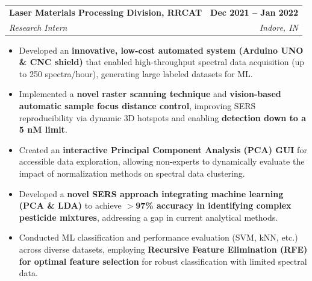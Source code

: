 \documentclass[letterpaper,11pt]{article}
\makeatletter
\newcommand{\resumeItem}[1]{
  \item\small{
    {#1 \vspace{-2pt}}
  }
}
\newcommand{\resumeSubheading}[4]{
  \vspace{-2pt}\item
    \begin{tabular*}{1.0\textwidth}[t]{l@{\extracolsep{\fill}}r}
      \textbf{#1} & \textbf{\small #2} \\
      \textit{\small#3} & \textit{\small #4} \\
    \end{tabular*}\vspace{-7pt}
}
\newcommand{\resumeItemListStart}{\begin{itemize}}
\newcommand{\resumeItemListEnd}{\end{itemize}\vspace{-5pt}}
\makeatother
\begin{document}

\resumeSubheading
{Laser Materials Processing Division, RRCAT \href{https://drive.google.com/file/d/17LdNpJl5PiLeAiSnUvo3jRqvBoKuyRCR/view?usp=sharing}{\raisebox{-0.2\height}\faExternalLink}}{Dec 2021 -- Jan 2022}
{Research Intern}{Indore, IN}
\resumeItemListStart
\resumeItem{Developed an \textbf{innovative, low-cost automated system (Arduino UNO \& CNC shield)} that enabled high-throughput spectral data acquisition (up to 250 spectra/hour), generating large labeled datasets for ML.}
\resumeItem{Implemented a \textbf{novel raster scanning technique} and \textbf{vision-based automatic sample focus distance control}, improving SERS reproducibility via dynamic 3D hotspots and enabling \textbf{detection down to a 5 nM limit}.}
\resumeItem{Created an \textbf{interactive Principal Component Analysis (PCA) GUI} for accessible data exploration, allowing non-experts to dynamically evaluate the impact of normalization methods on spectral data clustering.}
\resumeItem{Developed a \textbf{novel SERS approach integrating machine learning (PCA \& LDA)} to achieve \textbf{$>$97\% accuracy in identifying complex pesticide mixtures}, addressing a gap in current analytical methods.}
\resumeItem{Conducted ML classification and performance evaluation (SVM, kNN, etc.) across diverse datasets, employing \textbf{Recursive Feature Elimination (RFE) for optimal feature selection} for robust classification with limited spectral data.}
\resumeItemListEnd

\newpage
\end{document}
